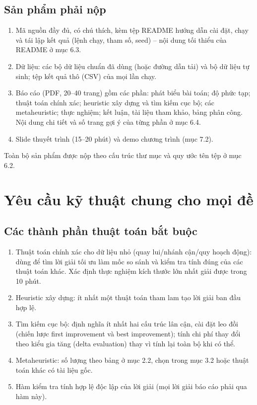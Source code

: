 \documentclass[a4paper,11pt]{article}
\begin{document}
\subsection{Sản phẩm phải nộp}
\begin{enumerate}
\item Mã nguồn đầy đủ, có chú thích, kèm tệp README hướng dẫn cài đặt, chạy và tái lập kết quả (lệnh chạy, tham số, seed) – nội dung tối thiểu của README ở mục 6.3.
\item Dữ liệu: các bộ dữ liệu chuẩn đã dùng (hoặc đường dẫn tải) và bộ dữ liệu tự sinh; tệp kết quả thô (CSV) của mọi lần chạy.
\item Báo cáo (PDF, 20–40 trang) gồm các phần: phát biểu bài toán; độ phức tạp; thuật toán chính xác; heuristic xây dựng và tìm kiếm cục bộ; các metaheuristic; thực nghiệm; kết luận, tài liệu tham khảo, bảng phân công. Nội dung chi tiết và số trang gợi ý của từng phần ở mục 6.4.
\item Slide thuyết trình (15–20 phút) và demo chương trình (mục 7.2).
\end{enumerate}
Toàn bộ sản phẩm được nộp theo cấu trúc thư mục và quy ước tên tệp ở mục 6.2.

\section{Yêu cầu kỹ thuật chung cho mọi đề}
\subsection{Các thành phần thuật toán bắt buộc}
\begin{enumerate}
\item Thuật toán chính xác cho dữ liệu nhỏ (quay lui/nhánh cận/quy hoạch động): dùng để tìm lời giải tối ưu làm mốc so sánh và kiểm tra tính đúng của các thuật toán khác. Xác định thực nghiệm kích thước lớn nhất giải được trong 10 phút.
\item Heuristic xây dựng: ít nhất một thuật toán tham lam tạo lời giải ban đầu hợp lệ.
\item Tìm kiếm cục bộ: định nghĩa ít nhất hai cấu trúc lân cận, cài đặt leo đồi (chiến lược first improvement và best improvement); tính chi phí thay đổi theo kiểu gia tăng (delta evaluation) thay vì tính lại toàn bộ khi có thể.
\item Metaheuristic: số lượng theo bảng ở mục 2.2, chọn trong mục 3.2 hoặc thuật toán khác có tài liệu gốc.
\item Hàm kiểm tra tính hợp lệ độc lập của lời giải (mọi lời giải báo cáo phải qua hàm này).
\end{enumerate}
\end{document}
